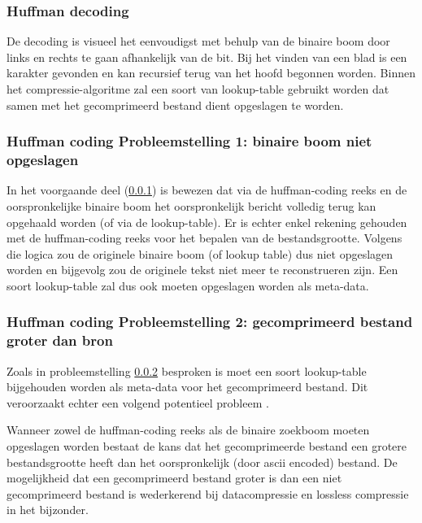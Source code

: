 \subsubsection{Huffman decoding}
\label{sec:primitieve-technieken-voorbeeld-huffman-decoding}
De \gls{decoding} is visueel het eenvoudigst met behulp van de binaire boom door links en rechts te gaan afhankelijk van de bit. Bij het vinden van een blad is een karakter gevonden en kan recursief terug van het hoofd begonnen worden. Binnen het \gls{compressie-algoritme} zal een soort van \gls{lookup-table} gebruikt worden dat samen met het gecomprimeerd bestand dient opgeslagen te worden.

\subsubsection{Huffman coding Probleemstelling 1: binaire boom niet opgeslagen}
\label{sec:primitieve-technieken-voorbeeld-huffman-probleem-1}
In het voorgaande deel (\ref{sec:primitieve-technieken-voorbeeld-huffman-decoding}) is bewezen dat via de \gls{huffman-coding} reeks en de oorspronkelijke binaire boom het oorspronkelijk bericht volledig terug kan opgehaald worden (of via de \gls{lookup-table}). Er is echter enkel rekening gehouden met de \gls{huffman-coding} reeks voor het bepalen van de bestandsgrootte. Volgens die logica zou de originele binaire boom (of lookup table) dus niet opgeslagen worden en bijgevolg zou de originele tekst niet meer te reconstrueren zijn. Een soort \gls{lookup-table} zal dus ook moeten opgeslagen worden als \gls{meta-data}.


\subsubsection{Huffman coding Probleemstelling 2: gecomprimeerd bestand groter dan bron}
Zoals in probleemstelling \ref{sec:primitieve-technieken-voorbeeld-huffman-probleem-1} besproken is moet een soort \gls{lookup-table} bijgehouden worden als \gls{meta-data} voor het gecomprimeerd bestand. Dit veroorzaakt echter een volgend potentieel probleem .


Wanneer zowel de \gls{huffman-coding} reeks als de binaire zoekboom moeten opgeslagen worden bestaat de kans dat het gecomprimeerde bestand een grotere bestandsgrootte heeft dan het oorspronkelijk (door \gls{ascii} encoded) bestand. De mogelijkheid dat een gecomprimeerd bestand groter is dan een niet gecomprimeerd bestand is wederkerend bij \gls{datacompressie} en \gls{lossless} compressie in het bijzonder.


